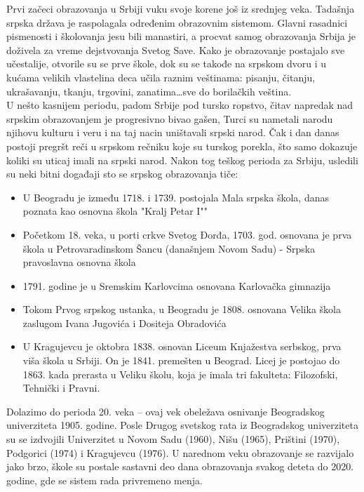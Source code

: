 \documentclass[a4paper]{article}
\begin{document}
\vspace{0.4cm}
Prvi začeci obrazovanja u Srbiji vuku svoje korene još iz srednjeg veka. Tadašnja srpska država je raspolagala određenim obrazovnim sistemom. Glavni rasadnici pismenosti i školovanja jesu bili manastiri, a procvat samog obrazovanja Srbija je doživela za vreme dejstvovanja Svetog Save. Kako je obrazovanje postajalo sve učestalije, otvorile su se prve škole, dok su se takođe na srpskom dvoru i u kućama velikih vlastelina deca učila raznim veštinama: pisanju, čitanju, ukrašavanju, tkanju, trgovini, zanatima…sve do borilačkih veština.\\
U nešto kasnijem periodu, padom Srbije pod tursko ropstvo, čitav napredak nad srpskim obrazovanjem je progresivno bivao gašen, Turci su nametali narodu njihovu kulturu i veru i na taj nacin uništavali srpski narod. Čak i dan danas postoji pregršt reči u srpskom rečniku koje su turskog porekla, što samo dokazuje koliki su uticaj imali na srpski narod.
 Nakon tog teškog perioda za Srbiju, usledili su neki bitni događaji sto se srpskog obrazovanja tiče:
 \begin{itemize}
    \item  U Beogradu je između 1718. i 1739. postojala Mala srpska škola, danas poznata kao osnovna škola "Kralj Petar I""\cite{referenca1}
    \item Početkom 18. veka, u porti crkve Svetog Đorđa, 1703. god. osnovana je prva škola u Petrovaradinskom Šancu (današnjem Novom Sadu) - Srpska pravoslavna osnovna škola
    \item 1791. godine je u Sremskim Karlovcima osnovana Karlovačka gimnazija\cite{referenca2}
    \item Tokom Prvog srpskog ustanka, u Beogradu je 1808. osnovana Velika škola zaslugom Ivana Jugovića i Dositeja Obradovića
    \item U Kragujevcu je oktobra 1838. osnovan Liceum Knjažestva serbskog, prva viša škola u Srbiji. On je 1841. premešten u Beograd. Licej je postojao do 1863. kada prerasta u Veliku školu, koja je imala tri fakulteta: Filozofski, Tehnički i Pravni.\cite{referenca3}
\end{itemize}
Dolazimo do perioda 20. veka – ovaj vek obeležava osnivanje Beogradskog univerziteta\cite{referenca4} 1905. godine. Posle Drugog svetskog rata iz Beogradskog univerziteta su se izdvojili Univerzitet u Novom Sadu (1960), Nišu (1965), Prištini (1970), Podgorici (1974) i Kragujevcu (1976).\cite{referenca4}
U narednom veku obrazovanje se razvijalo jako brzo, škole su postale sastavni deo dana obrazovanja svakog deteta do 2020. godine, gde se sistem rada privremeno menja.
\end{document}
